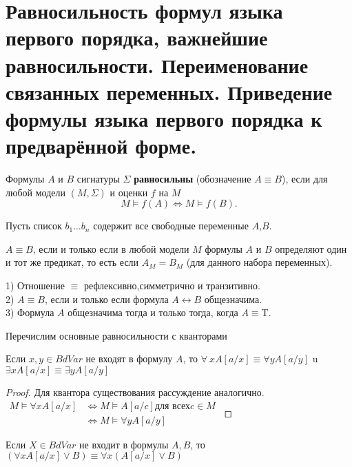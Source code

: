 \section[Равносильности формул языка первого порядка, важнейшие равносильности. Переименовывание связанных
переменных. Предварённая форма формулы.]{\sloppy Равносильность формул языка первого порядка, важнейшие
равносильности. Переименование связанных переменных. Приведение формулы языка первого порядка к предварённой
форме.}
\begin{definition}
	Формулы $A$ и $B$ сигнатуры $\Sigma$ \textbf{равносильны} (обозначение $A\equiv B$), если для любой модели
	$(M,\Sigma)$ и оценки $f$ на $M$
    $$M \vDash f(A) \Longleftrightarrow M \vDash f(B).$$
\end{definition}
Пусть список $b_1 \dots b_n$ содержит все свободные переменные $A$,$B$.
\begin{proposition}
	$A\equiv B$, если и только если в любой модели $M$ формулы $A$ и $B$ определяют один и тот же предикат, то есть
	если $A_M=B_M$ (для данного набора переменных).
\end{proposition}
\begin{proposition}
1) Отношение $\equiv$ рефлексивно,симметрично и транзитивно.\\
2) $A\equiv B$, если и только если формула $A \leftrightarrow B$ общезначима.\\
3) Формула $A$ общезначима тогда и только тогда, когда $A \equiv$\textup{T}.
\end{proposition}
Перечислим основные равносильности с кванторами
\begin{lemma}
	Если $x,y \in BdVar$ не входят в формулу $A$, то $\forall \:x A[a / x] \equiv \forall y A[a / y]$ u $\exists x
	A[a / x] \equiv \exists y A[a / y] $
\end{lemma}
\begin{proof}
    Для квантора существования рассуждение аналогично.\\
    $\begin{aligned}
    M \vDash \forall x A[a / x] & \Longleftrightarrow M \vDash A[a / c] \text{для всех} c \in M\\
    & \Longleftrightarrow M \vDash \forall y A[a / y]
    \end{aligned}$
\end{proof}
\begin{lemma}
    Если $X\in BdVar$ не входит в формулы $A,B$, то $(\forall x A[a / x] \vee B) \equiv \forall x(A[a / x] \vee B)$
\end{lemma}
